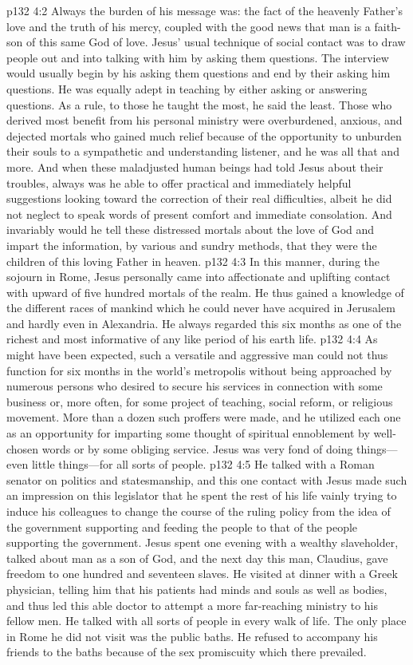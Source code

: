 \vs p132 4:2 Always the burden of his message was: the fact of the heavenly Father’s love and the truth of his mercy, coupled with the good news that man is a faith\hyp{}son of this same God of love. Jesus’ usual technique of social contact was to draw people out and into talking with him by asking them questions. The interview would usually begin by his asking them questions and end by their asking him questions. He was equally adept in teaching by either asking or answering questions. As a rule, to those he taught the most, he said the least. Those who derived most benefit from his personal ministry were overburdened, anxious, and dejected mortals who gained much relief because of the opportunity to unburden their souls to a sympathetic and understanding listener, and he was all that and more. And when these maladjusted human beings had told Jesus about their troubles, always was he able to offer practical and immediately helpful suggestions looking toward the correction of their real difficulties, albeit he did not neglect to speak words of present comfort and immediate consolation. And invariably would he tell these distressed mortals about the love of God and impart the information, by various and sundry methods, that they were the children of this loving Father in heaven.
\vs p132 4:3 In this manner, during the sojourn in Rome, Jesus personally came into affectionate and uplifting contact with upward of five hundred mortals of the realm. He thus gained a knowledge of the different races of mankind which he could never have acquired in Jerusalem and hardly even in Alexandria. He always regarded this six months as one of the richest and most informative of any like period of his earth life.
\vs p132 4:4 As might have been expected, such a versatile and aggressive man could not thus function for six months in the world’s metropolis without being approached by numerous persons who desired to secure his services in connection with some business or, more often, for some project of teaching, social reform, or religious movement. More than a dozen such proffers were made, and he utilized each one as an opportunity for imparting some thought of spiritual ennoblement by well\hyp{}chosen words or by some obliging service. Jesus was very fond of doing things---even little things---for all sorts of people.
\pc \vs p132 4:5 He talked with a Roman senator on politics and statesmanship, and this one contact with Jesus made such an impression on this legislator that he spent the rest of his life vainly trying to induce his colleagues to change the course of the ruling policy from the idea of the government supporting and feeding the people to that of the people supporting the government. Jesus spent one evening with a wealthy slaveholder, talked about man as a son of God, and the next day this man, Claudius, gave freedom to one hundred and seventeen slaves. He visited at dinner with a Greek physician, telling him that his patients had minds and souls as well as bodies, and thus led this able doctor to attempt a more far\hyp{}reaching ministry to his fellow men. He talked with all sorts of people in every walk of life. The only place in Rome he did not visit was the public baths. He refused to accompany his friends to the baths because of the sex promiscuity which there prevailed.
